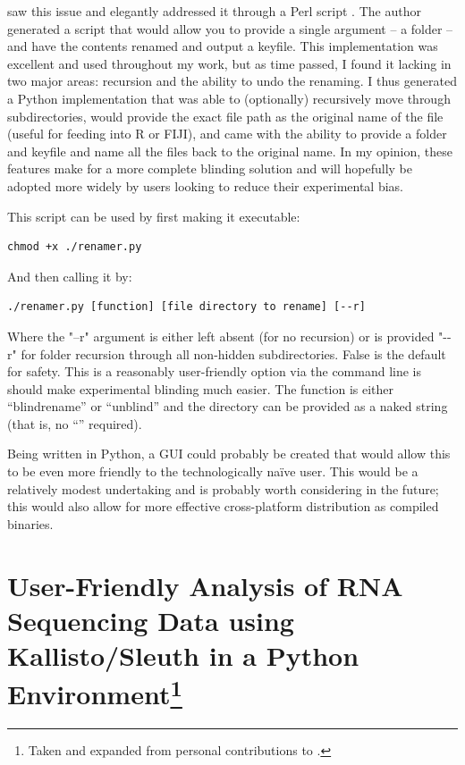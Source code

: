 \citet{Salter2016} saw this issue and elegantly addressed it through a Perl script \citep{Wall2000}. The author generated a script that would allow you to provide a single argument -- a folder -- and have the contents renamed and output a keyfile. This implementation was excellent and used throughout my work, but as time passed, I found it lacking in two major areas: recursion and the ability to undo the renaming. I thus generated a Python implementation that was able to (optionally) recursively move through subdirectories, would provide the exact file path as the original name of the file (useful for feeding into R or FIJI), and came with the ability to provide a folder and keyfile and name all the files back to the original name. In my opinion, these features make for a more complete blinding solution and will hopefully be adopted more widely by users looking to reduce their experimental bias.

This script can be used by first making it executable:

\begin{code}
\begin{verbatim}
chmod +x ./renamer.py
\end{verbatim}
\end{code}

And then calling it by:

\begin{code}
\begin{verbatim}
./renamer.py [function] [file directory to rename] [--r]
\end{verbatim}
\end{code}

Where the "--r" argument is either left absent (for no recursion) or is provided "\hyp{}\hyp{}r" for folder recursion through all non-hidden subdirectories. False is the default for safety. This is a reasonably user-friendly option via the command line is should make experimental blinding much easier. The function is either ``blindrename'' or ``unblind'' and the directory can be provided as a naked string (that is, no ``'' required).

Being written in Python, a GUI could probably be created that would allow this to be even more friendly to the technologically na\"{i}ve user. This would be a relatively modest undertaking and is probably worth considering in the future; this would also allow for more effective cross-platform distribution as compiled binaries.

\section[User-Friendly Analysis of RNA Sequencing Data using Kallisto/Sleuth in a Python Environment]{User-Friendly Analysis of RNA Sequencing Data using Kallisto/Sleuth in a Python Environment\footnote{Taken and expanded from personal contributions to .}}\label{rnaseq}

